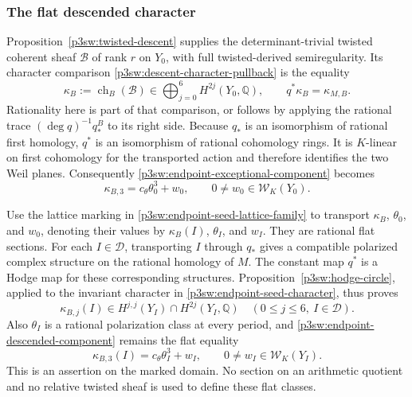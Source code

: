 \documentclass[11pt]{article}
\newcommand{\Q}{\mathbb Q}
\numberwithin{equation}{section}
\begin{document}
\subsubsection{The flat descended character}

Proposition~\ref{p3sw:twisted-descent} supplies the determinant-trivial
twisted coherent sheaf \(\mathcal B\) of rank \(r\) on \(Y_0\),
with full twisted-derived semiregularity.  Its character comparison
\eqref{p3sw:descent-character-pullback} is the equality
\begin{equation}
\label{p3sw:endpoint-descended-character}
 \kappa_B:=\operatorname{ch}_B(\mathcal B)\in
       \bigoplus_{j=0}^6 H^{2j}(Y_0,\Q),\qquad
 q^*\kappa_B=\kappa_{M,B}.
\end{equation}
Rationality here is part of that comparison, or follows by applying
the rational trace \((\deg q)^{-1}q_*^B\) to its right side.
Because \(q_*\) is an isomorphism of rational first homology,
\(q^*\) is an isomorphism of rational cohomology rings.  It is
\(K\)-linear on first cohomology for the transported action and
therefore identifies the two Weil planes.  Consequently
\eqref{p3sw:endpoint-exceptional-component} becomes
\begin{equation}
\label{p3sw:endpoint-descended-component}
 \kappa_{B,3}=c_\theta\theta_0^3+w_0,\qquad
 0\ne w_0\in\mathcal W_K(Y_0).
\end{equation}

Use the lattice marking in \eqref{p3sw:endpoint-seed-lattice-family}
to transport \(\kappa_B\), \(\theta_0\), and \(w_0\), denoting their
values by \(\kappa_B(I)\), \(\theta_I\), and \(w_I\).
They are rational flat sections.  For each \(I\in\mathscr D\),
transporting \(I\) through \(q_*\) gives a compatible polarized
complex structure on the rational homology of \(M\).  The constant
map \(q^*\) is a Hodge map for these corresponding structures.
Proposition~\ref{p3sw:hodge-circle}, applied to the invariant
character in \eqref{p3sw:endpoint-seed-character}, thus proves
\begin{equation}
\label{p3sw:endpoint-flat-hodge}
 \kappa_{B,j}(I)\in H^{j,j}(Y_I)\cap H^{2j}(Y_I,\Q)
       \quad(0\leq j\leq6,\ I\in\mathscr D).
\end{equation}
Also \(\theta_I\) is a rational polarization class at every
period, and \eqref{p3sw:endpoint-descended-component} remains the
flat equality
\[
 \kappa_{B,3}(I)=c_\theta\theta_I^3+w_I,\qquad
 0\ne w_I\in\mathcal W_K(Y_I).
\]
This is an assertion on the marked domain.  No section on an
arithmetic quotient and no relative twisted sheaf is used to
define these flat classes.
\end{document}
